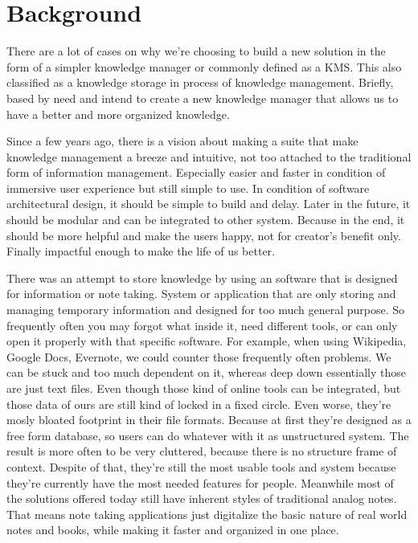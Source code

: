 \section{Background}
\label{sec:background}

There are a lot of cases on why we're choosing to build a new solution in the form of a simpler knowledge manager or commonly defined as a \ac{KMS}.
This also classified as a knowledge storage in process of knowledge management.
Briefly, based by need and intend to create a new knowledge manager that allows us to have a better and more organized knowledge.

Since a few years ago, there is a vision about making a suite that make knowledge management a breeze and intuitive, not too attached to the traditional form of information management.
Especially easier and faster in condition of immersive user experience but still simple to use.
In condition of software architectural design, it should be simple to build and delay.
Later in the future, it should be modular and can be integrated to other system.
Because in the end, it should be more helpful and make the users happy, not for creator's benefit only.
Finally impactful enough to make the life of us better.

There was an attempt to store knowledge by using an software that is designed for information or note taking. System or application that are only storing and managing temporary information and designed for too much general purpose.
So frequently often you may forgot what inside it, need different tools, or can only open it properly with that specific software.
For example, when using Wikipedia, Google Docs, Evernote, we could counter those frequently often problems.
We can be stuck and too much dependent on it, whereas deep down essentially those are just text files.
Even though those kind of online tools can be integrated, but those data of ours are still kind of locked in a fixed circle.
Even worse, they're mosly bloated footprint in their file formats.
Because at first they're designed as a free form database, so users can do whatever with it as unstructured system.
The result is more often to be very cluttered, because there is no structure frame of context.
Despite of that, they're still the most usable tools and system because they're currently have the most needed features for people.
Meanwhile most of the solutions offered today still have inherent styles of traditional analog notes.
That means note taking applications just digitalize the basic nature of real world notes and books, while making it faster and organized in one place.

